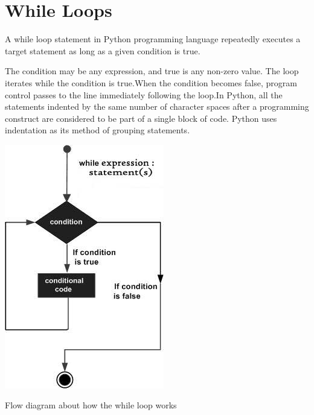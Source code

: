 










\chapter{While Loops}

A {\color{red}while loop} statement in Python programming language repeatedly executes a target statement as long as a given condition is true.

\vspace{1cm}
The condition may be any expression, and true is any non-zero value. The loop iterates while the condition is true.When the condition becomes false, program control passes to the line immediately following the loop.In Python, all the statements indented by the same number of character spaces after a programming construct are considered to be part of a single block of code. Python uses indentation as its method of grouping statements.

\begin{marginfigure}
  \includegraphics[width=\linewidth]{whileloop.jpeg}
  \caption{Flow diagram about how the while loop works}
  \label{fig:marginfig}
\end{marginfigure}

